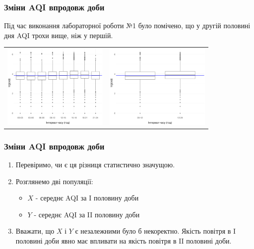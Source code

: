 \documentclass{beamer}
\begin{document}
\begin{frame}
  \frametitle{Зміни AQI впродовж доби}

  Під час виконання лабораторної роботи №1 було помічено,
  що у другій половині дня AQI трохи вище, ніж у першій. 

  \begin{center}
    \begin{tabular}{cc}
      \includegraphics[width=2in]{./plots/lab2/hypotheses/daytime_3hr_vs_aqi.png} &
      \includegraphics[width=2in]{./plots/lab2/hypotheses/daytime_12hr_vs_aqi.png}
    \end{tabular}
  \end{center}
\end{frame}

\begin{frame}[fragile=singleslide]
  \frametitle{Зміни AQI впродовж доби}

  \begin{enumerate}
    \item Перевіримо, чи є ця різниця статистично значущою.
    \item Розглянемо дві популяції:

      \begin{itemize}
        \item $X$ - середнє AQI за I половину доби
        \item $Y$ - середнє AQI за II половину доби
      \end{itemize}
    \item Вважати, що $X$ і $Y$ є незалежними було б некоректно. 
    Якість повітря в I половині доби явно має впливати на 
    якість повітря в II половині доби.
  \end{enumerate}
\end{frame}
\end{document}
